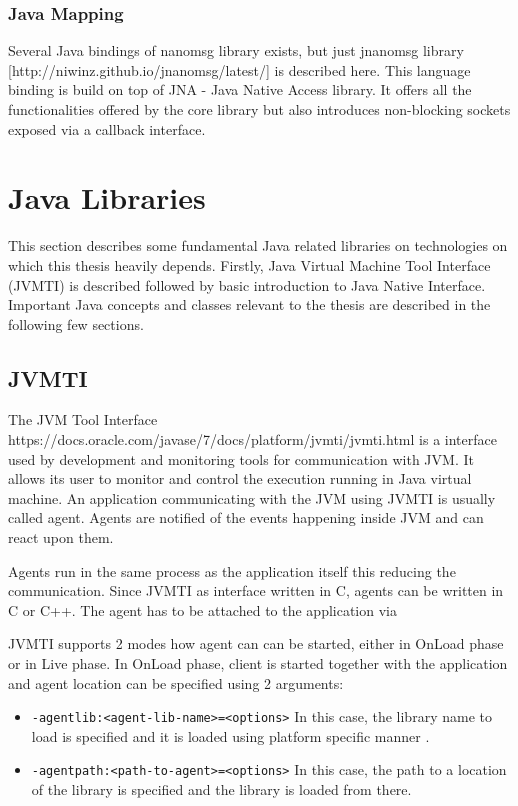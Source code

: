 \subsubsection{Java Mapping}
Several Java bindings of nanomsg library exists, but just jnanomsg library [http://niwinz.github.io/jnanomsg/latest/] is described here. This language binding is build on top of JNA - Java Native Access library. It offers all the functionalities offered by the core library but also introduces non-blocking sockets exposed via a callback interface.

\section{Java Libraries}
This section describes some fundamental Java related libraries on technologies on which this thesis heavily depends. Firstly, Java Virtual Machine Tool Interface (JVMTI) is described followed by basic introduction to Java Native Interface. Important Java concepts and classes relevant to the thesis are described in the following few sections.
\subsection{JVMTI}
The JVM Tool Interface https://docs.oracle.com/javase/7/docs/platform/jvmti/jvmti.html is a interface used by development and monitoring tools for communication with JVM. It allows its user to monitor and control the execution running in Java virtual machine. An application communicating with the JVM using JVMTI is usually called agent. Agents are notified of the events happening inside JVM and can react upon them.

Agents run in the same process as the application itself this reducing the communication. Since JVMTI as interface written in C, agents can be written in C or C++. The agent has to be attached to the application via 

JVMTI supports 2 modes how agent can can be started, either in OnLoad phase or in Live phase. In OnLoad phase, client is started together with the application and agent location can be specified using 2 arguments:
\begin{itemize}
	\item \texttt{-agentlib:<agent-lib-name>=<options>} \newline
	In this case, the library name to load is specified and it is loaded using platform specific manner .
	\item \texttt{-agentpath:<path-to-agent>=<options>} \newline
	In this case, the path to a location of the library is specified and the library is loaded from there.
\end{itemize}

